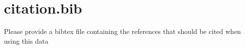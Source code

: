 \section{citation.bib}

Please provide a bibtex file containing the references that should be cited when using this data


% 
